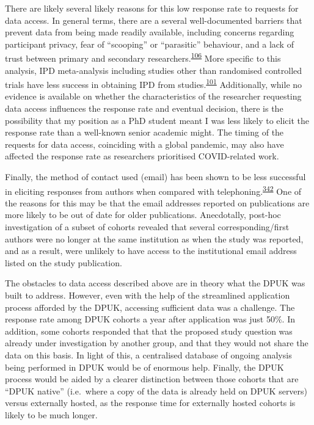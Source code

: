 \documentclass[a4paper, twoside]{templates/ociamthesis}
\begin{document}
There are likely several likely reasons for this low response rate to requests for data access. In general terms, there are a several well-documented barriers that prevent data from being made readily available, including concerns regarding participant privacy, fear of ``scooping'' or ``parasitic'' behaviour, and a lack of trust between primary and secondary researchers.\textsuperscript{\protect\hyperlink{ref-vanpanhuis2014}{106}} More specific to this analysis, IPD meta-analysis including studies other than randomised controlled trials have less success in obtaining IPD from studies.\textsuperscript{\protect\hyperlink{ref-nevitt2017}{101}} Additionally, while no evidence is available on whether the characteristics of the researcher requesting data access influences the response rate and eventual decision, there is the possibility that my position as a PhD student meant I was less likely to elicit the response rate than a well-known senior academic might. The timing of the requests for data access, coinciding with a global pandemic, may also have affected the response rate as researchers prioritised COVID-related work.

Finally, the method of contact used (email) has been shown to be less successful in eliciting responses from authors when compared with telephoning.\textsuperscript{\protect\hyperlink{ref-danko2019}{342}} One of the reasons for this may be that the email addresses reported on publications are more likely to be out of date for older publications. Anecdotally, post-hoc investigation of a subset of cohorts revealed that several corresponding/first authors were no longer at the same institution as when the study was reported, and as a result, were unlikely to have access to the institutional email address listed on the study publication.

The obstacles to data access described above are in theory what the DPUK was built to address. However, even with the help of the streamlined application process afforded by the DPUK, accessing sufficient data was a challenge. The response rate among DPUK cohorts a year after application was just 50\%. In addition, some cohorts responded that that the proposed study question was already under investigation by another group, and that they would not share the data on this basis. In light of this, a centralised database of ongoing analysis being performed in DPUK would be of enormous help. Finally, the DPUK process would be aided by a clearer distinction between those cohorts that are ``DPUK native'' (i.e.~where a copy of the data is already held on DPUK servers) versus externally hosted, as the response time for externally hosted cohorts is likely to be much longer.
\end{document}
